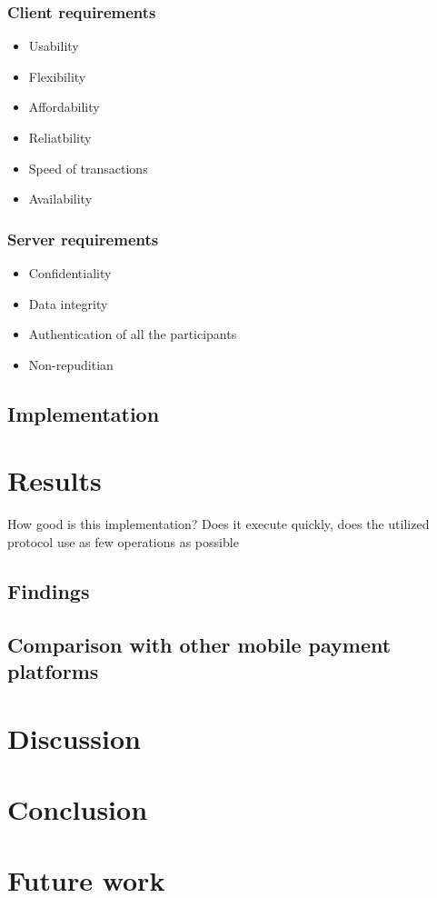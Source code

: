 \documentclass[11pt, a4paper]{article}
\begin{document}
\subsubsection{Client requirements}
\begin{itemize}
    \item Usability
    \item Flexibility
    \item Affordability
    \item Reliatbility
    \item Speed of transactions
    \item Availability
\end{itemize}
\subsubsection{Server requirements}
\begin{itemize}
    \item Confidentiality
    \item Data integrity
    \item Authentication of all the participants
    \item Non-repuditian
\end{itemize}

\subsection{Implementation}

\section{Results}
How good is this implementation? Does it execute quickly, does the utilized protocol use as few operations as possible
\subsection{Findings}
\subsection{Comparison with other mobile payment platforms}

\section{Discussion}
\section{Conclusion}
\section{Future work}

\begingroup
\let\cleardoublepage\clearpage


\endgroup
\end{document}
